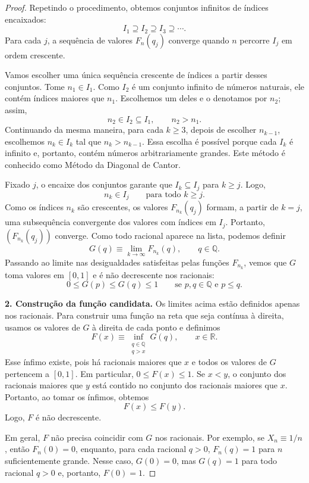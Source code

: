 \documentclass[12pt,portuguese]{article}
\theoremstyle{definition}
\theoremstyle{plainexercise}
\theoremstyle{starredexercise}
\theoremstyle{definition}
\begin{document}
\begin{proof}
Repetindo o procedimento, obtemos conjuntos infinitos de índices encaixados:
\[
I_1\supseteq I_2\supseteq I_3\supseteq\cdots.
\]
Para cada $j$, a sequência de valores $F_n(q_j)$ converge quando $n$
percorre $I_j$ em ordem crescente.

Vamos escolher uma única sequência crescente de índices a partir desses
conjuntos. Tome $n_1\in I_1$. Como $I_2$ é um conjunto infinito de números
naturais, ele contém índices maiores que $n_1$. Escolhemos um deles e o
denotamos por $n_2$; assim,
\[
n_2\in I_2\subseteq I_1,
\qquad
n_2>n_1.
\]
Continuando da mesma maneira, para cada $k\geqslant3$, depois de escolher
$n_{k-1}$, escolhemos $n_k\in I_k$ tal que $n_k>n_{k-1}$. Essa escolha é
possível porque cada $I_k$ é infinito e, portanto, contém números
arbitrariamente grandes. Este método é conhecido como Método da Diagonal de Cantor.

Fixado $j$, o encaixe dos conjuntos garante que $I_k\subseteq I_j$ para
$k\geqslant j$. Logo,
\[
n_k\in I_j\qquad\text{para todo }k\geqslant j.
\]
Como os índices $n_k$ são crescentes, os valores $F_{n_k}(q_j)$ formam, a
partir de $k=j$, uma subsequência convergente dos valores com índices em
$I_j$. Portanto, $(F_{n_k}(q_j))$ converge. Como todo racional aparece na
lista, podemos definir
\[
G(q)\equiv\lim_{k\to\infty}F_{n_k}(q),\qquad q\in\mathbb{Q}.
\]
Passando ao limite nas desigualdades satisfeitas pelas funções $F_{n_k}$,
vemos que $G$ toma valores em $[0,1]$ e é não decrescente nos racionais:
\[
0\leqslant G(p)\leqslant G(q)\leqslant1
\qquad\text{se }p,q\in\mathbb{Q}\text{ e }p\leqslant q.
\]

\smallskip
\noindent\textbf{2. Construção da função candidata.}
Os limites acima estão definidos apenas nos racionais. Para construir uma
função na reta que seja contínua à direita, usamos os valores de $G$ à
direita de cada ponto e definimos
\[
F(x)\equiv\inf_{\substack{q\in\mathbb{Q}\\q>x}}G(q),
\qquad x\in\mathbb{R}.
\]
Esse ínfimo existe, pois há racionais maiores que $x$ e todos os valores de
$G$ pertencem a $[0,1]$. Em particular, $0\leqslant F(x)\leqslant1$.
Se $x<y$, o conjunto dos racionais maiores que $y$ está contido no conjunto
dos racionais maiores que $x$. Portanto, ao tomar os ínfimos, obtemos
\[
F(x)\leqslant F(y).
\]
Logo, $F$ é não decrescente.

\bigskip 

Em geral, $F$ não precisa coincidir com $G$ nos racionais. Por exemplo, se
$X_n\equiv1/n$, então $F_n(0)=0$, enquanto, para cada racional $q>0$,
$F_n(q)=1$ para $n$ suficientemente grande. Nesse caso, $G(0)=0$, mas
$G(q)=1$ para todo racional $q>0$ e, portanto, $F(0)=1$.


\end{proof}
\end{document}
